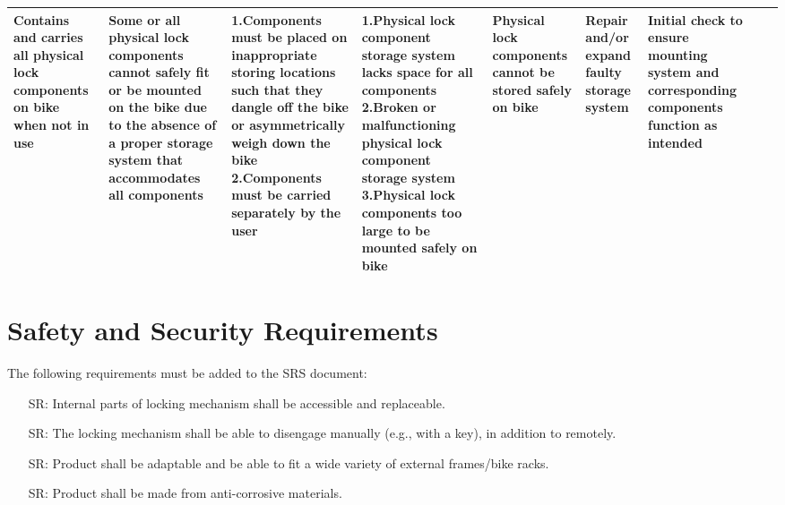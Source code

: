 \documentclass{article}
\newcounter{srnum} %
\begin{document}
\begin{table}[H]
\begin{tabular}{| p{} | p{}  | p{} | p{} | p{} | p{} | p{} | p{} | p{} |}
Contains and carries all physical lock components on bike when not in use & Some or all physical lock components cannot safely fit or be mounted on the bike due to the absence of a proper storage system that accommodates all components & 1.Components must be placed on inappropriate storing locations such that they dangle off the bike or asymmetrically weigh down the bike \newline 2.Components must be carried separately by the user & 1.Physical lock component storage system lacks space for all components \newline 2.Broken or malfunctioning physical lock component storage system \newline 3.Physical lock components too large to be mounted safely on bike & Physical lock components cannot be stored safely on bike & Repair and/or expand faulty storage system & Initial check to ensure mounting system and corresponding components function as intended &  &  \\ \hline
\end{tabular}
\end{table}

\section{Safety and Security Requirements}

The following requirements must be added to the SRS document:
\begin{itemize}
\item[SR\refstepcounter{srnum}\thesrnum\label{SR1}:] Internal parts of locking mechanism shall be accessible and replaceable.
\item[SR\refstepcounter{srnum}\thesrnum\label{SR2}:] The locking mechanism shall be able to disengage manually (e.g., with a key), in addition to remotely.
\item[SR\refstepcounter{srnum}\thesrnum\label{SR3}:] Product shall be adaptable and be able to fit a wide variety of external frames/bike racks.
\item[SR\refstepcounter{srnum}\thesrnum\label{SR4}:] Product shall be made from anti-corrosive materials. 




\end{itemize}
\end{document}
